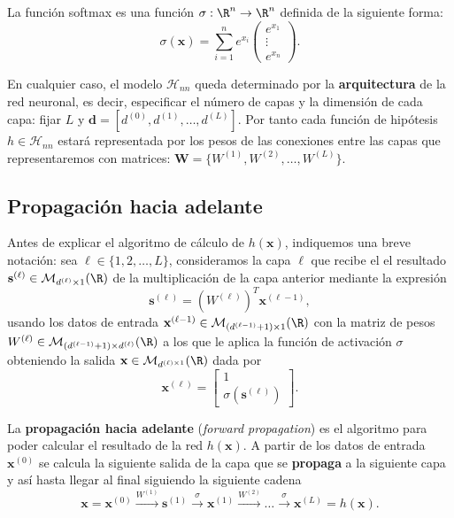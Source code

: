 \begin{definicion}[Softmax]
  La función softmax es una función $\sigma : \R^n \to \R^n$ definida de la siguiente forma:
  $$\sigma(\textbf{x}) = \sum \limits^n_{i = 1} e^{x_i} \begin{pmatrix} e^{x_1} \\ \vdots \\ e^{x_n}\end{pmatrix}.$$
  \label{def:softmax}
\end{definicion}

En cualquier caso, el modelo $\mathcal{H}_{nn}$ queda determinado por la \textbf{arquitectura} de la red neuronal, es decir, especificar el número de capas y la dimensión de cada capa: fijar $L$ y $\textbf{d} = [d^{(0)}, d^{(1)}, \ldots, d^{(L)}]$. Por tanto cada función de hipótesis $h \in \mathcal{H}_{nn}$ estará representada por los pesos de las conexiones entre las capas que representaremos con matrices: $\textbf{W} = \{W^{(1)}, W^{(2)}, \ldots, W^{(L)}\}$.

\subsection{Propagación hacia adelante}

Antes de explicar el algoritmo de cálculo de $h(\textbf{x})$, indiquemos una breve notación: sea $\ell \in \{1, 2, \ldots, L\}$, consideramos la capa $\ell$ que recibe el el resultado $\textbf{s}^{(\ell)} \in \mathcal{M}_{d^{(\ell)} \times 1}(\R)$ de la multiplicación de la capa anterior mediante la expresión
\begin{equation*}
  \textbf{s}^{(\ell)} = (W^{(\ell)})^T \textbf{x}^{(\ell-1)},
  \label{eq:fp1}
\end{equation*}
usando los datos de entrada $\textbf{x}^{(\ell-1)} \in \mathcal{M}_{(d^{(\ell-1)} + 1) \times 1}(\R)$ con la matriz de pesos $W^{(\ell)} \in \mathcal{M}_{(d^{(\ell-1)} + 1) \times d^{(\ell)}}(\R)$ a los que le aplica la función de activación $\sigma$ obteniendo la salida $\textbf{x} \in \mathcal{M}_{d^{(\ell) \times 1}}(\R)$ dada por
\begin{equation*}
  \textbf{x}^{(\ell)} = \begin{bmatrix} 1 \\ \sigma(\textbf{s}^{(\ell)})\end{bmatrix}.
  \label{eq:fp2}
\end{equation*}

La \textbf{propagación hacia adelante} (\emph{forward propagation}) es el algoritmo para poder calcular el resultado de la red $h(\textbf{x})$. A partir de los datos de entrada $\textbf{x}^{(0)}$ se calcula la siguiente salida de la capa que se \textbf{propaga} a la siguiente capa y así hasta llegar al final siguiendo la siguiente cadena
\begin{equation}
  \textbf{x} = \textbf{x}^{(0)} \xrightarrow[]{W^{(1)}} \textbf{s}^{(1)} \xrightarrow[]{\sigma} \textbf{x}^{(1)} \xrightarrow{W^{(2)}} \ldots \xrightarrow{\sigma} \textbf{x}^{(L)} = h(\textbf{x}).
  \label{eq:cadena-fp}
\end{equation}

